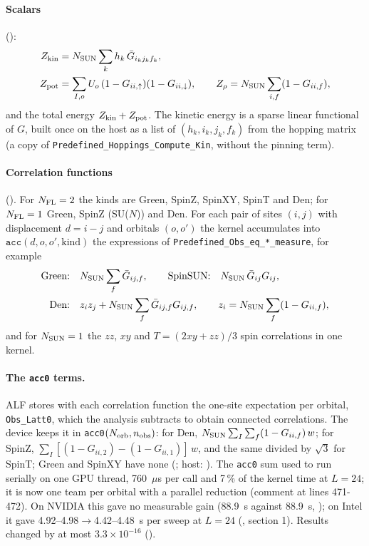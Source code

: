 \paragraph{Scalars} ():
\begin{align}
Z_{\rm kin} &= N_{\rm SUN}\sum_{k} h_k\,\bar G_{i_k j_k f_k}, \\
Z_{\rm pot} &= \sum_{I,o}U_o\,(1-G_{ii,\uparrow})(1-G_{ii,\downarrow}),\qquad
Z_\rho = N_{\rm SUN}\sum_{i,f}(1-G_{ii,f}),
\end{align}
and the total energy $Z_{\rm kin}+Z_{\rm pot}$. The kinetic energy is a sparse linear functional of $G$, built once on the host as a list of $(h_k,i_k,j_k,f_k)$ from the hopping matrix (a copy of \texttt{Predefined\_Hoppings\_Compute\_Kin}, without the pinning term).

\paragraph{Correlation functions} (). For $N_{\rm FL}=2$ the kinds are Green, SpinZ, SpinXY, SpinT and Den; for $N_{\rm FL}=1$ Green, SpinZ (SU($N$)) and Den. For each pair of sites $(i,j)$ with displacement $d=i-j$ and orbitals $(o,o')$ the kernel accumulates into $\texttt{acc}(d,o,o',\text{kind})$ the expressions of \texttt{Predefined\_Obs\_eq\_*\_measure}, for example
\begin{align}
\text{Green:}&\quad N_{\rm SUN}\sum_f\bar G_{ij,f},\qquad
\text{SpinSUN:}\quad N_{\rm SUN}\,\bar G_{ij}G_{ij},\\
\text{Den:}&\quad z_iz_j + N_{\rm SUN}\sum_f\bar G_{ij,f}G_{ij,f},\qquad z_i=N_{\rm SUN}\sum_f (1-G_{ii,f}),
\end{align}
and for $N_{\rm SUN}=1$ the $zz$, $xy$ and $T=(2xy+zz)/3$ spin correlations in one kernel.

\paragraph{The \texttt{acc0} terms.} ALF stores with each correlation function the one-site expectation per orbital, \texttt{Obs\_Latt0}, which the analysis subtracts to obtain connected correlations. The device keeps it in \texttt{acc0}$(N_{\rm orb},n_{\rm obs})$: for Den, $N_{\rm SUN}\sum_I\sum_f(1-G_{ii,f})\,w$; for SpinZ, $\sum_I[(1-G_{ii,2})-(1-G_{ii,1})]\,w$, and the same divided by $\sqrt3$ for SpinT; Green and SpinXY have none (; host: ). The \texttt{acc0} sum used to run serially on one GPU thread, 760~$\mu$s per call and 7\,\% of the kernel time at $L=24$; it is now one team per orbital with a parallel reduction (comment at lines 471-472). On NVIDIA this gave no measurable gain (88.9~s against 88.9~s, ); on Intel it gave 4.92--4.98$\to$4.42--4.48~s per sweep at $L=24$ (, section 1). %
Results changed by at most $3.3\times10^{-16}$ ().

